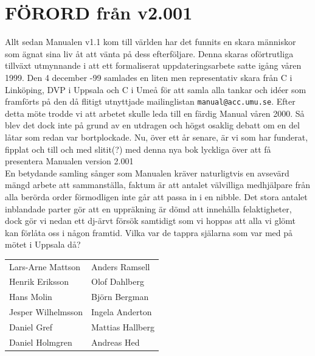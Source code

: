 \documentclass[a6paper,fontsize=10pt,twoside,open=right]{scrbook}
\begin{document}
\section{FÖRORD från v2.001}\par
\vspace{10pt}
\hspace{10pt}Allt sedan Manualen v1.1 kom till världen har det
funnits en skara människor som ägnat sina liv åt att vänta på dess
efterföljare. Denna skaras oförtrutliga tillväxt utmynnande i att ett
formaliserat uppdateringsarbete satte igång våren 1999. Den 4 december
-99 samlades en liten men representativ skara från C i Linköping, DVP
i Uppsala och C i Umeå för att samla alla tankar och idéer som
framförts på den då flitigt utnyttjade mailinglistan
\texttt{manual@acc.umu.se}. Efter detta möte trodde vi att arbetet
skulle leda till en färdig Manual våren 2000. Så blev det dock inte på
grund av en utdragen och högst osaklig debatt om en del låtar som
redan var bortplockade. Nu, över ett år senare, är vi som har
funderat, fipplat och till och med slitit(?) med denna nya bok
lyckliga över att få presentera Manualen version 2.001\\ \indent En
betydande samling sånger som Manualen kräver naturligtvis en avsevärd
mängd arbete att sammanställa, faktum är att antalet välvilliga
medhjälpare från alla berörda order förmodligen inte går att passa in
i en nibble. Det stora antalet inblandade parter gör att en uppräkning
är dömd att innehålla felaktigheter, dock gör vi nedan ett dj-ärvt
försök samtidigt som vi hoppas att alla vi glömt kan förlåta oss i
någon framtid.
\newpage
\indent Vilka var de tappra själarna som var med på mötet i Uppsala
då?\par
\vspace{10pt}
\noindent
\begin{tabular}{@{}p{}p{}@{}}
  Lars-Arne Mattson & Anders Ramsell\\
  Henrik Eriksson & Olof Dahlberg\\
  Hans Molin & Björn Bergman\\
  Jesper Wilhelmsson & Ingela Anderton\\
  Daniel Gref & Mattias Hallberg\\
  Daniel Holmgren & Andreas Hed
\end{tabular}\par
\vspace{10pt}
\end{document}
